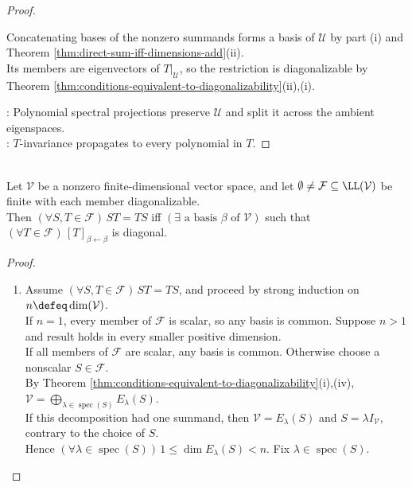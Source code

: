\begin{lemma}
\begin{proof}
\begin{enumerate}[label=(\roman*)]
Concatenating bases of the nonzero summands forms a basis of $\mathcal{U}$ by part (i) and Theorem \ref{thm:direct-sum-iff-dimensions-add}(ii).\\
Its members are eigenvectors of $T|_{\mathcal{U}}$, so the restriction is diagonalizable by Theorem \ref{thm:conditions-equivalent-to-diagonalizability}(ii),(i).
\end{enumerate}
: Polynomial spectral projections preserve $\mathcal{U}$ and split it across the ambient eigenspaces.\\
: $T$-invariance propagates to every polynomial in $T$.
\end{proof}
\end{lemma}

\begin{theorem} \label{thm:simultaneous-diagonalization-commuting-diagonalizable-family} \\
Let $\mathcal{V}$ be a nonzero finite-dimensional vector space, and let $\emptyset\neq\mathcal{F}\subseteq\LL(\mathcal{V})$ be finite with each member diagonalizable.\\
Then $(\forall S,T\in\mathcal{F})\,ST=TS$ iff $(\exists\text{ a basis }\beta\text{ of }\mathcal{V})$ such that $(\forall T\in\mathcal{F})\,[T]_{\beta\leftarrow\beta}$ is diagonal.
\begin{proof}
\begin{enumerate}[label=\roman*.]
\setlength{\itemsep}{0pt}
\item[$(\Rightarrow)$] Assume $(\forall S,T\in\mathcal{F})\,ST=TS$, and proceed by strong induction on $n\defeq\dim(\mathcal{V})$.\\
If $n=1$, every member of $\mathcal{F}$ is scalar, so any basis is common. Suppose $n>1$ and result holds in every smaller positive dimension.\\
If all members of $\mathcal{F}$ are scalar, any basis is common. Otherwise choose a nonscalar $S\in\mathcal{F}$.\\
By Theorem \ref{thm:conditions-equivalent-to-diagonalizability}(i),(iv), $\mathcal{V}=\bigoplus\limits_{\lambda\in\operatorname{spec}(S)}E_{\lambda}(S)$.\\
If this decomposition had one summand, then $\mathcal{V}=E_{\lambda}(S)$ and $S=\lambda I_{\mathcal{V}}$, contrary to the choice of $S$.\\
Hence $(\forall\lambda\in\operatorname{spec}(S))\,1\leq\dim E_{\lambda}(S)<n$. Fix $\lambda\in\operatorname{spec}(S)$.\\

\end{enumerate}
\end{proof}
\end{theorem}

